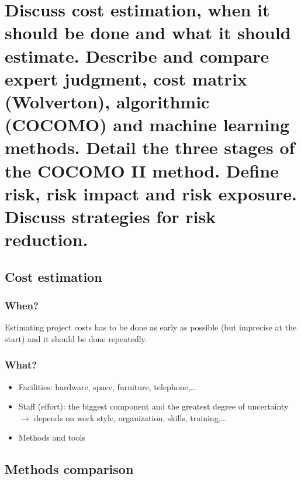 \clearpage{}
\section{Discuss cost estimation, when it should be done and what it should
estimate. Describe and compare expert judgment, cost matrix (Wolverton),
algorithmic (COCOMO) and machine learning methods. Detail the three stages
of the COCOMO II method. Define risk, risk impact and risk exposure. Discuss
strategies for risk reduction.}

\subsection{Cost estimation}

\subsubsection{When?}

Estimating project costs has to be done as early as possible (but imprecise at the start) and
it should be done repeatedly.

\subsubsection{What?}

\begin{itemize}
    \item Facilities: hardware, space, furniture, telephone,\ldots
    \item Staff (effort): the biggest component and the greatest degree of uncertainty $\rightarrow$ depends on work style, organization, skills, training,\ldots
    \item Methods and tools
\end{itemize}

\subsection{Methods comparison}

